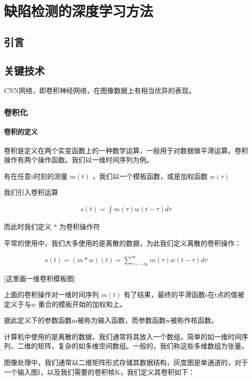 \chapter{缺陷检测的深度学习方法}
\section{引言}

\section{关键技术}
CNN网络，即卷积神经网络，在图像数据上有相当优异的表现。

\subsection{卷积化}

\subsubsection{卷积的定义}

卷积是定义在两个实变函数上的一种数学运算，一般用于对数据做平滑运算。卷积操作有两个操作函数。我们以一维时间序列为例。

有在任意t时刻的测量 $ m(t) $ ，我们以一个模板函数，或是加权函数 $ w(\tau) $

我们引入卷积运算

\begin{eqnarray}
    s(t) =  \int m(\tau)w(t-\tau)d\tau
\end{eqnarray}

而此时我们定义 $ \ast $ 为卷积操作符

平常的使用中，我们大多使用的是离散的数据，为此我们定义离散的卷积操作：

\begin{eqnarray}
    s(t) = (m \ast w)(t) = \sum^{\infty}_{\tau = -\infty} m(\tau)w(t-\tau)d\tau
\end{eqnarray}

[这里画一维卷积模板图]

上面的卷积操作对一维时间序列 $ m(t) $ 有了结果，最终的平滑函数s在t点的值被定义于与$ w $ 重合的模板开始的加权和上。

据此定义下的参数函数m被称为输入函数，而参数函数w被称作核函数。

计算机中使用的是离散的数据，我们通常将其放入一个数组，简单的如一维时间序列、二维的矩阵，复杂的如多维空间数组。一般的，我们称这些多维数组为张量。

图像处理中，我们通常以二维矩阵形式存储其数据结构，灰度图是单通道的，对于一个输入图I，以及我们需要的卷积核K，我们定义其卷积如下：

